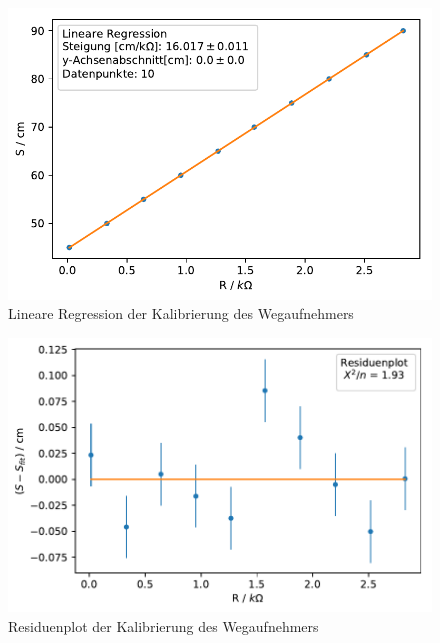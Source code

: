 \documentclass[12pt,a4paper]{article}
\begin{document}
\begin{figure}[H]
	\centering
	\includegraphics[scale=1]{Python/WegaufKal_LinReg.pdf}
	\caption{Lineare Regression der Kalibrierung des Wegaufnehmers}
	\label{Abstandskal_LinReg}
\end{figure}
\begin{figure}[H]
	\centering
	\includegraphics[scale=1]{Python/WegaufKal_Residuen.pdf}
	\caption{Residuenplot der Kalibrierung des Wegaufnehmers}
	\label{Abstandskal_Residuenplot}
\end{figure}
\end{document}
